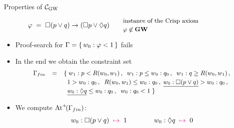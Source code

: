 
\begin{frame}{Properties of $\mathcal{C}_{\mathrm{GW}}$}





  
\[
  \varphi\;=\; \Box(p\lor q) \to (\Box p\lor \Diam q) \qquad
  \begin{minipage}{15em}\small
    instance of the Crisp axiom
    \\[.5ex]
$\varphi\not\in\GWL$
  \end{minipage}
\]


\medskip
\begin{itemize}
\item Proof-search for $\Gamma=\{\,   w_0:\varphi < 1    \,\}$ fails

 \medskip
\item In  the end we obtain the constraint set
  \[\small
    \begin{array}{lcl}
      \Gamma_{fin} &=&\{\;  w_1:p<R(w_0,w_1)\,,\;\; w_1:p\leq w_0 : q_0\,, \;\;  w_1 : q \geq R(w_0,w_1)\,,
\\[.5ex] &&\;\;
1> w_0 : q_0\,,   \;\;  R(w_0,w_1)\leq w_0 : q_0\,,\;
            \underline{w_0:  \Box(p\lor q)} > w_0 : q_0\,,
\\[.5ex] &&\;\;
   \underline{w_0: \lozenge q}  \leq  w_0 : q_0\,,\;\;  w_0 : q_0   < 1 \;\}
    \end{array}
    \]


    \medskip
 \item We compute  $\mathrm{At}^{+}\!( \Gamma_{fin} )$:
\[            
  w_0:  \Box(p\lor q) \;\;{\color{magenta} \mapsto}\;\; 1 \hspace{4em}
  w_0: \lozenge q\;\;{\color{magenta} \mapsto}\;\; 0
\]
\end{itemize}
\VFILL
\end{frame}


